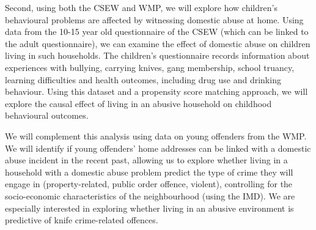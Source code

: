 \documentclass[11pt, a4paper]{article}
\begin{document}
Second, using both the CSEW and WMP, we will explore how children's behavioural problems are affected by witnessing domestic abuse at home. Using data from the 10-15 year old questionnaire of the CSEW (which can be linked to the adult questionnaire), we can examine the effect of domestic abuse on children living in such households. The children's questionnaire records information about experiences with bullying, carrying knives, gang membership, school truancy, learning difficulties and health outcomes, including drug use and drinking behaviour. Using this dataset and a propensity score matching approach, we will explore the causal effect of living in an abusive household on childhood behavioural outcomes.

We will complement this analysis using data on young offenders from the WMP. We will identify if young offenders' home addresses can be linked with a domestic abuse incident in the recent past, allowing us to explore whether living in a household with a domestic abuse problem predict the type of crime they will engage in (property-related, public order offence, violent), controlling for the socio-economic characteristics of the neighbourhood (using the IMD). We are especially interested in exploring whether living in an abusive environment is predictive of knife crime-related offences.
\end{document}
